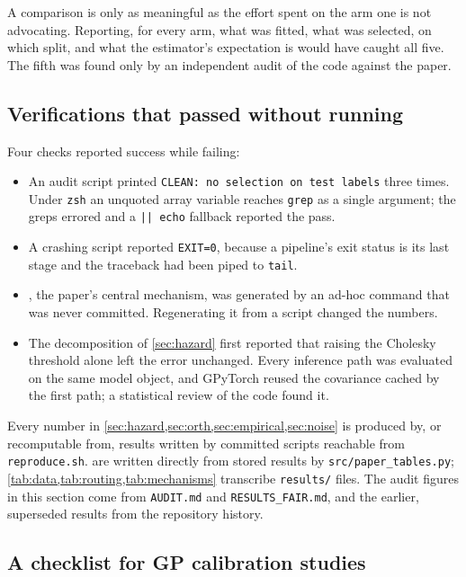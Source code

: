 \documentclass[11pt]{article}
\begin{document}
A comparison is only as meaningful as the effort spent on the arm one is not
advocating. Reporting, for every arm, what was fitted, what was selected, on which
split, and what the estimator's expectation is would have caught all five. The fifth
was found only by an independent audit of the code against the paper.

\subsection{Verifications that passed without running}

Four checks reported success while failing:

\begin{itemize}
\item An audit script printed \texttt{CLEAN: no selection on test labels} three times.
Under \texttt{zsh} an unquoted array variable reaches \texttt{grep} as a single
argument; the greps errored and a \texttt{|| echo} fallback reported the pass.
\item A crashing script reported \texttt{EXIT=0}, because a pipeline's exit status is
its last stage and the traceback had been piped to \texttt{tail}.
\item {}, the paper's central mechanism, was generated by an ad-hoc
command that was never committed. Regenerating it from a script changed the numbers.
\item The decomposition of \cref{sec:hazard} first reported that raising the Cholesky
threshold alone left the error unchanged. Every inference path was evaluated on the
same model object, and GPyTorch reused the covariance cached by the first path; a
statistical review of the code found it.
\end{itemize}

Every number in \cref{sec:hazard,sec:orth,sec:empirical,sec:noise} is produced by, or
recomputable from, results written by committed scripts reachable from
\texttt{reproduce.sh}. 
are written directly from stored results by \texttt{src/paper\_tables.py};
\cref{tab:data,tab:routing,tab:mechanisms} transcribe \texttt{results/} files. The audit
figures in this section come from \texttt{AUDIT.md} and \texttt{RESULTS\_FAIR.md}, and
the earlier, superseded results from the repository history.

\subsection{A checklist for GP calibration studies}
\end{document}
